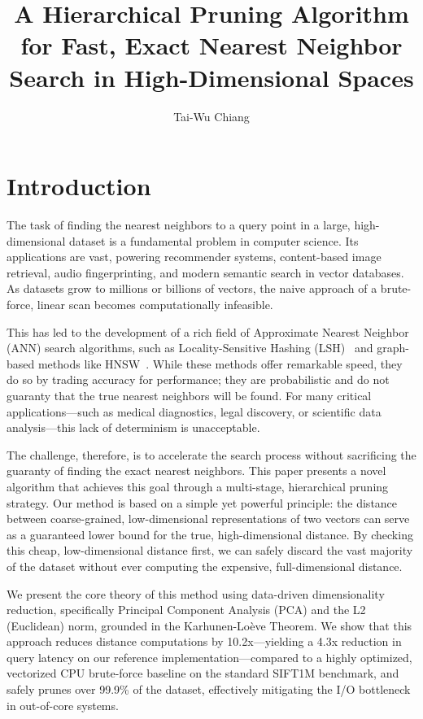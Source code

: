 \documentclass[sigconf,nonacm]{acmart}
\title{A Hierarchical Pruning Algorithm for Fast, Exact Nearest Neighbor Search in High-Dimensional Spaces}
\author{Tai-Wu Chiang}
\affiliation{%
  \institution{twchiang@utexas.edu}
  \city{California}
  \country{USA}
}
\begin{document}
\maketitle


\section{Introduction}

The task of finding the nearest neighbors to a query point in a large, high-dimensional dataset is a fundamental problem in computer science. Its applications are vast, powering recommender systems, content-based image retrieval, audio fingerprinting, and modern semantic search in vector databases. As datasets grow to millions or billions of vectors, the naive approach of a brute-force, linear scan becomes computationally infeasible.

This has led to the development of a rich field of Approximate Nearest Neighbor (ANN) search algorithms, such as Locality-Sensitive Hashing (LSH)~\cite{gionis1999similarity} and graph-based methods like HNSW~\cite{malkov2018efficient}. While these methods offer remarkable speed, they do so by trading accuracy for performance; they are probabilistic and do not guaranty that the true nearest neighbors will be found. For many critical applications—such as medical diagnostics, legal discovery, or scientific data analysis—this lack of determinism is unacceptable.

The challenge, therefore, is to accelerate the search process without sacrificing the guaranty of finding the exact nearest neighbors. This paper presents a novel algorithm that achieves this goal through a multi-stage, hierarchical pruning strategy. Our method is based on a simple yet powerful principle: the distance between coarse-grained, low-dimensional representations of two vectors can serve as a guaranteed lower bound for the true, high-dimensional distance. By checking this cheap, low-dimensional distance first, we can safely discard the vast majority of the dataset without ever computing the expensive, full-dimensional distance.

We present the core theory of this method using data-driven dimensionality reduction, specifically Principal Component Analysis (PCA) and the L2 (Euclidean) norm, grounded in the Karhunen-Loève Theorem. We show that this approach reduces distance computations by 10.2x---yielding a 4.3x reduction in query latency on our reference implementation---compared to a highly optimized, vectorized CPU brute-force baseline on the standard SIFT1M benchmark, and safely prunes over 99.9\% of the dataset, effectively mitigating the I/O bottleneck in out-of-core systems.
\end{document}

